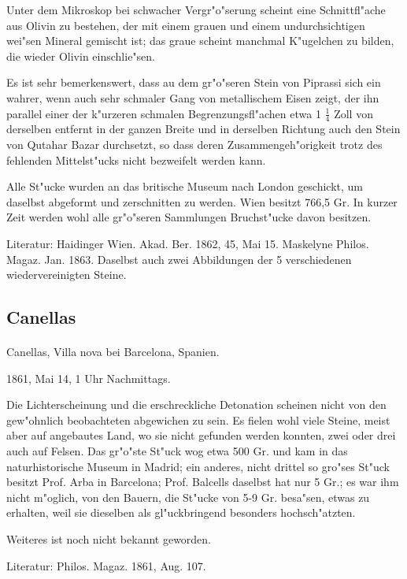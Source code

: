 \documentclass[a4paper, 11pt, oneside]{article}
\begin{document}
Unter dem Mikroskop bei schwacher Vergr"o"serung scheint eine Schnittfl"ache aus Olivin zu bestehen, der mit einem grauen und einem undurchsichtigen wei"sen Mineral gemischt ist; das graue scheint manchmal K"ugelchen zu bilden, die wieder Olivin einschlie"sen.

Es ist sehr bemerkenswert, dass au dem gr"o"seren Stein von Piprassi sich ein wahrer, wenn auch sehr schmaler Gang von metallischem Eisen zeigt, der ihn parallel einer der k"urzeren schmalen Begrenzungsfl"achen etwa 1 $\frac{1}{4}$ Zoll von derselben entfernt in der ganzen Breite und in derselben Richtung auch den Stein von Qutahar Bazar durchsetzt, so dass deren Zusammengeh"origkeit trotz des fehlenden Mittelst"ucks nicht bezweifelt werden kann.

Alle St"ucke wurden an das britische Museum nach London geschickt, um daselbst abgeformt und zerschnitten zu werden. Wien besitzt 766,5 Gr. In kurzer Zeit werden wohl alle gr"o"seren Sammlungen Bruchst"ucke davon besitzen.

Literatur: Haidinger Wien. Akad. Ber. 1862, 45, Mai 15. Maskelyne Philos. Magaz. Jan. 1863. Daselbst auch zwei Abbildungen der 5 verschiedenen wiedervereinigten Steine.

\subsection{Canellas}
\normalsize
\paragraph{}
Canellas, Villa nova bei Barcelona, Spanien.

1861, Mai 14, 1 Uhr Nachmittags.

Die Lichterscheinung und die erschreckliche Detonation scheinen nicht von den gew"ohnlich beobachteten abgewichen zu sein. Es fielen wohl viele Steine, meist aber auf angebautes Land, wo sie nicht gefunden werden konnten, zwei oder drei auch auf Felsen. Das gr"o"ste St"uck wog etwa 500 Gr. und kam in das naturhistorische Museum in Madrid; ein anderes, nicht drittel so gro"ses St"uck besitzt Prof. Arba in Barcelona; Prof. Balcells daselbst hat nur 5 Gr.; es war ihm nicht m"oglich, von den Bauern, die St"ucke von 5-9 Gr. besa"sen, etwas zu erhalten, weil sie dieselben als gl"uckbringend besonders hochsch"atzten.

Weiteres ist noch nicht bekannt geworden.

Literatur: Philos. Magaz. 1861, Aug. 107.
\end{document}
